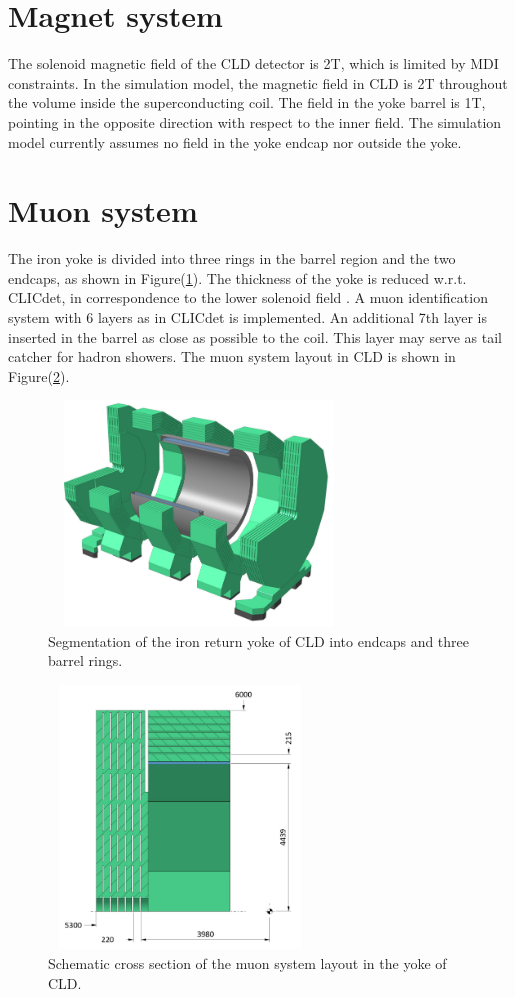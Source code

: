 \section{Magnet system}
The solenoid magnetic field of the CLD detector  is 2T, 
which is limited by MDI constraints. 
In the simulation model, the magnetic field in CLD is 2T 
throughout the volume inside the superconducting coil. The 
field in the yoke barrel is 1T, pointing in the opposite 
direction with respect to the
inner field. The simulation model currently assumes no field in 
the yoke endcap nor outside the yoke.


\section{Muon system}
The iron  yoke is divided  into three rings in the barrel region and the two endcaps, as shown in
Figure(\ref{fig:muon}). The thickness of the yoke is reduced w.r.t. CLICdet, in correspondence to the lower solenoid
field . A muon identification system with 6 layers as in CLICdet is implemented. An additional 7th layer
is inserted in the barrel as close as possible to the coil. This layer may serve as tail catcher for hadron
showers. The muon system layout in CLD is shown in Figure(\ref{fig:yoke}).

\begin{figure}[ht]
    \centering
    \includegraphics[width=8cm, height=6cm]{fcc_det/ph12.png}
    \caption{Segmentation of the iron return yoke of CLD into endcaps and three barrel rings.}
    \label{fig:muon}
\end{figure}

\begin{figure}[ht]
    \centering
    \includegraphics[width = 7cm, height = 7cm]{fcc_det/ph13.png}
    \caption{ Schematic cross section of the muon system layout in the yoke of CLD.}
    \label{fig:yoke}
\end{figure}